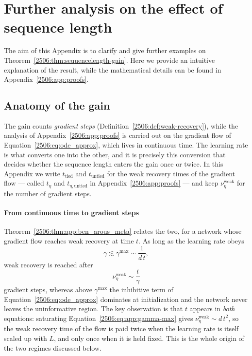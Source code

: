 \section{Further analysis on the effect of sequence length} \label{2506:app:further-sequence-length}
The aim of this Appendix is to clarify and give further examples on Theorem~\ref{2506:thm:sequencelength-gain}. Here we provide an intuitive explanation of the result, while the mathematical details can be found in Appendix~\ref{2506:app:proofs}. 

\subsection{Anatomy of the gain}
The gain counts \emph{gradient steps} (Definition~\ref{2506:def:weak-recovery}), while the analysis of Appendix~\ref{2506:app:proofs} is carried out on the gradient flow of Equation~\eqref{2506:eq:ode_approx}, which lives in continuous time. The learning rate is what converts one into the other, and it is precisely this conversion that decides whether the sequence length enters the gain once or twice. In this Appendix we write \(t_\mathrm{tied}\) and \(t_\mathrm{untied}\) for the weak recovery times of the gradient flow --- called \(t_\eta\) and \(t_{\eta,\mathrm{untied}}\) in Appendix~\ref{2506:app:proofs} --- and keep \(\nu^\mathrm{weak}_\eta\) for the number of gradient steps.

\paragraph{From continuous time to gradient steps}
Theorem~\ref{2506:thm:app:ben_arous_meta} relates the two, for a network whose gradient flow reaches weak recovery at time \(t\). As long as the learning rate obeys
\begin{equation} \label{2506:eq:app:gamma-max}
    \gamma \lesssim \gamma^\mathrm{max} \sim \frac{1}{d\,t},
\end{equation}
weak recovery is reached after
\begin{equation} \label{2506:eq:app:steps-from-flow}
    \nu^\mathrm{weak}_\eta \sim \frac{t}{\gamma}
\end{equation}
gradient steps, whereas above \(\gamma^\mathrm{max}\) the inhibitive term of Equation~\eqref{2506:eq:ode_approx} dominates at initialization and the network never leaves the uninformative region. The key observation is that \(t\) appears in \emph{both} equations: saturating Equation~\eqref{2506:eq:app:gamma-max} gives \(\nu^\mathrm{weak}_\eta \sim d\,t^2\), so the weak recovery time of the flow is paid twice when the learning rate is itself scaled up with \(L\), and only once when it is held fixed. This is the whole origin of the two regimes discussed below.

